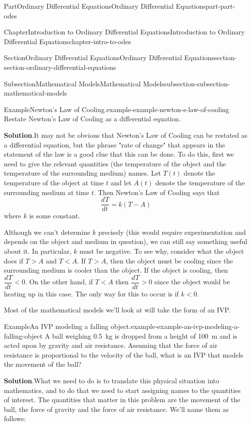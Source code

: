 \documentclass[twoside,10pt,]{book}
\newcommand{\blocktitlefont}{\relax}
\numberwithin{equation}{part}
\newcommand{\dv}[3][]{\dfrac{d^{#1} #2}{d #3^{#1}}}
\newcommand{\lt}{<}
\newcommand{\gt}{>}
\begin{document}
\begin{partptx}{Part}{Ordinary Differential Equations}{}{Ordinary Differential Equations}{}{}{part-part-odes}
\begin{chapterptx}{Chapter}{Introduction to Ordinary Differential Equations}{}{Introduction to Ordinary Differential Equations}{}{}{chapter-intro-to-odes}
\begin{sectionptx}{Section}{Ordinary Differential Equations}{}{Ordinary Differential Equations}{}{}{section-section-ordinary-differential-equations}
\begin{subsectionptx}{Subsection}{Mathematical Models}{}{Mathematical Models}{}{}{subsection-subsection-mathematical-models}
\begin{example}{Example}{Newton's Law of Cooling.}{example-example-newton-s-law-of-cooling}
Restate Newton's Law of Cooling as a differential equation.%
\par\smallskip%
\noindent\textbf{\blocktitlefont Solution}.\hypertarget{solution-example-newton-s-law-of-cooling-c}{}\quad{}It may not be obvious that Newton's Law of Cooling can be restated as a differential equation, but the phrase "rate of change" that appears in the statement of the law is a good clue that this can be done. To do this, first we need to give the relevant quantities (the temperature of the object and the temperature of the surrounding medium) names. Let \(T(t)\) denote the temperature of the object at time \(t\) and let \(A(t)\) denote the temperature of the surrounding medium at time \(t\). Then Newton's Law of Cooling says that%
\begin{equation*}
\dv{T}{t} = k(T-A)
\end{equation*}
where \(k\) is some constant.%
\par
Although we can't determine \(k\) precisely (this would require experimentation and depends on the object and medium in question), we can still say something useful about it. In particular, \(k\) must be negative. To see why, consider what the object does if \(T\gt A\) and \(T\lt A\). If \(T\gt A\), then the object must be cooling since the surrounding medium is cooler than the object. If the object is cooling, then \(\dv{T}{t}\lt0\). On the other hand, if \(T\lt A\) then \(\dv{T}{t}\gt0\) since the object would be heating up in this case. The only way for this to occur is if \(k\lt0\).%
\end{example}
Most of the mathematical models we'll look at will take the form of an IVP.%
\begin{example}{Example}{An IVP modeling a falling object.}{example-example-an-ivp-modeling-a-falling-object}%
A ball weighing \SI{0.5}{\kilo\gram} is dropped from a height of \SI{100}{\meter} and is acted upon by gravity and air resistance. Assuming that the force of air resistance is proportional to the velocity of the ball, what is an IVP that models the movement of the ball?%
\par\smallskip%
\noindent\textbf{\blocktitlefont Solution}.\hypertarget{solution-example-an-ivp-modeling-a-falling-object-c}{}\quad{}What we need to do is to translate this physical situation into mathematics, and to do that we need to start assigning names to the quantities of interest. The quantities that matter in this problem are the movement of the ball, the force of gravity and the force of air resistance. We'll name them as follows:%

\end{example}
\end{subsectionptx}
\end{sectionptx}
\end{chapterptx}
\end{partptx}
\end{document}
